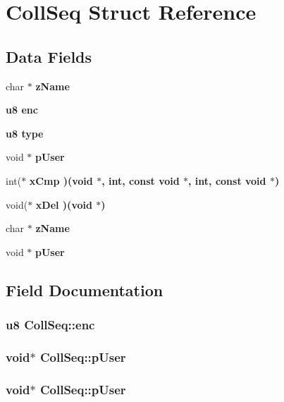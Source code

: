 \section{Coll\-Seq Struct Reference}
\label{structCollSeq}
\subsection*{Data Fields}
\begin{CompactItemize}
\item 
char $\ast$ \bf{z\-Name}
\item 
\bf{u8} \bf{enc}
\item 
\bf{u8} \bf{type}
\item 
void $\ast$ \bf{p\-User}
\item 
int($\ast$ \bf{x\-Cmp} )(void $\ast$, int, const void $\ast$, int, const void $\ast$)
\item 
void($\ast$ \bf{x\-Del} )(void $\ast$)
\item 
char $\ast$ \bf{z\-Name}
\item 
void $\ast$ \bf{p\-User}
\end{CompactItemize}


\subsection{Field Documentation}
\subsubsection{\setlength{\rightskip}{0pt plus 5cm}\bf{u8} \bf{Coll\-Seq::enc}}\label{structCollSeq_537cf72d33c3c9135d103bcd7f655745}


\subsubsection{\setlength{\rightskip}{0pt plus 5cm}void$\ast$ \bf{Coll\-Seq::p\-User}}\label{structCollSeq_11fcedb6f813a78f8b749ac5ff2a9b5e}


\subsubsection{\setlength{\rightskip}{0pt plus 5cm}void$\ast$ \bf{Coll\-Seq::p\-User}}\label{structCollSeq_11fcedb6f813a78f8b749ac5ff2a9b5e}


